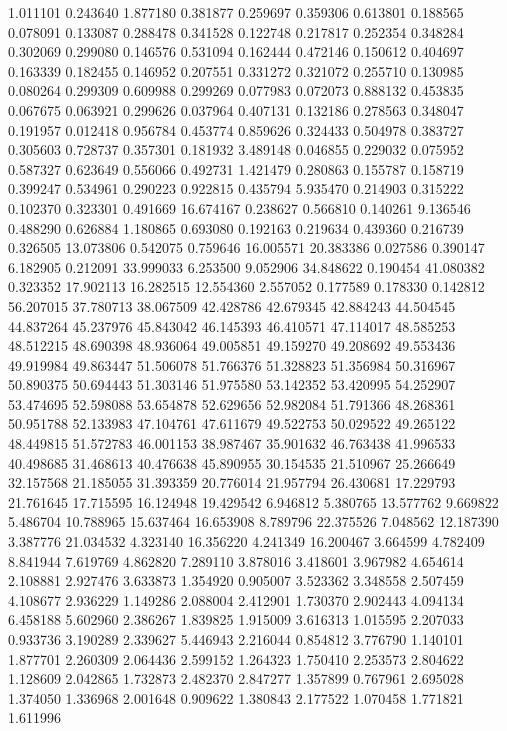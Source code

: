 1.011101
0.243640
1.877180
0.381877
0.259697
0.359306
0.613801
0.188565
0.078091
0.133087
0.288478
0.341528
0.122748
0.217817
0.252354
0.348284
0.302069
0.299080
0.146576
0.531094
0.162444
0.472146
0.150612
0.404697
0.163339
0.182455
0.146952
0.207551
0.331272
0.321072
0.255710
0.130985
0.080264
0.299309
0.609988
0.299269
0.077983
0.072073
0.888132
0.453835
0.067675
0.063921
0.299626
0.037964
0.407131
0.132186
0.278563
0.348047
0.191957
0.012418
0.956784
0.453774
0.859626
0.324433
0.504978
0.383727
0.305603
0.728737
0.357301
0.181932
3.489148
0.046855
0.229032
0.075952
0.587327
0.623649
0.556066
0.492731
1.421479
0.280863
0.155787
0.158719
0.399247
0.534961
0.290223
0.922815
0.435794
5.935470
0.214903
0.315222
0.102370
0.323301
0.491669
16.674167
0.238627
0.566810
0.140261
9.136546
0.488290
0.626884
1.180865
0.693080
0.192163
0.219634
0.439360
0.216739
0.326505
13.073806
0.542075
0.759646
16.005571
20.383386
0.027586
0.390147
6.182905
0.212091
33.999033
6.253500
9.052906
34.848622
0.190454
41.080382
0.323352
17.902113
16.282515
12.554360
2.557052
0.177589
0.178330
0.142812
56.207015
37.780713
38.067509
42.428786
42.679345
42.884243
44.504545
44.837264
45.237976
45.843042
46.145393
46.410571
47.114017
48.585253
48.512215
48.690398
48.936064
49.005851
49.159270
49.208692
49.553436
49.919984
49.863447
51.506078
51.766376
51.328823
51.356984
50.316967
50.890375
50.694443
51.303146
51.975580
53.142352
53.420995
54.252907
53.474695
52.598088
53.654878
52.629656
52.982084
51.791366
48.268361
50.951788
52.133983
47.104761
47.611679
49.522753
50.029522
49.265122
48.449815
51.572783
46.001153
38.987467
35.901632
46.763438
41.996533
40.498685
31.468613
40.476638
45.890955
30.154535
21.510967
25.266649
32.157568
21.185055
31.393359
20.776014
21.957794
26.430681
17.229793
21.761645
17.715595
16.124948
19.429542
6.946812
5.380765
13.577762
9.669822
5.486704
10.788965
15.637464
16.653908
8.789796
22.375526
7.048562
12.187390
3.387776
21.034532
4.323140
16.356220
4.241349
16.200467
3.664599
4.782409
8.841944
7.619769
4.862820
7.289110
3.878016
3.418601
3.967982
4.654614
2.108881
2.927476
3.633873
1.354920
0.905007
3.523362
3.348558
2.507459
4.108677
2.936229
1.149286
2.088004
2.412901
1.730370
2.902443
4.094134
6.458188
5.602960
2.386267
1.839825
1.915009
3.616313
1.015595
2.207033
0.933736
3.190289
2.339627
5.446943
2.216044
0.854812
3.776790
1.140101
1.877701
2.260309
2.064436
2.599152
1.264323
1.750410
2.253573
2.804622
1.128609
2.042865
1.732873
2.482370
2.847277
1.357899
0.767961
2.695028
1.374050
1.336968
2.001648
0.909622
1.380843
2.177522
1.070458
1.771821
1.611996
